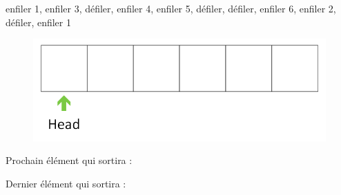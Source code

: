 \documentclass[11pt,a4paper]{article}
\begin{document}
\begin{center}

\begin{large}
enfiler 1, enfiler 3, défiler, enfiler 4, enfiler 5, défiler, défiler, enfiler 6, enfiler 2, défiler, enfiler 1
\end{large}


\begin{figure}[ht!]
\centering
\centerline{  %
\includegraphics[scale=1]{img/empty_head_2.png}
}
\end{figure}


\vspace*{-0.75cm}




\begin{table}[ht!]
  \begin{minipage}{0.50\textwidth}

Prochain élément qui sortira :

  \end{minipage}
  \hfillx
  \begin{minipage}{0.50\textwidth}

Dernier élément qui sortira :

  \end{minipage}
\end{table}
\end{center}
\end{document}
